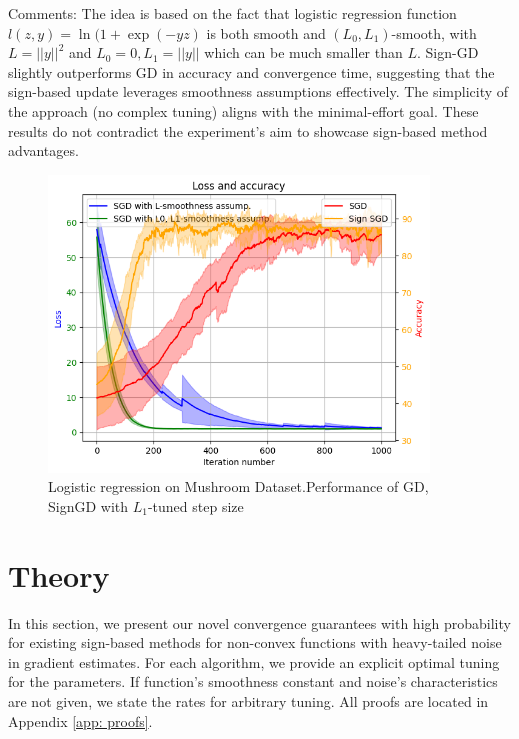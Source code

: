 \documentclass[12pt]{article}
\begin{document}
Comments: 
The idea is based on the fact that logistic regression function $l(z,y) = \ln (1 + \exp(-yz)$  is both smooth and $(L_0, L_1)$-smooth, with $L = || y ||^2$ and $L_0 = 0, L_1 = || y ||$ which can be much smaller than $L$. Sign-GD slightly outperforms GD in accuracy and convergence time, suggesting that the sign-based update leverages smoothness assumptions effectively. The simplicity of the approach (no complex tuning) aligns with the minimal-effort goal. These results do not contradict the experiment’s aim to showcase sign-based method advantages.
\begin{figure}[!h]
    \centering
    \includegraphics[width=0.9\textwidth]{basic_experiment2.png}
    \caption{Logistic regression on Mushroom Dataset.\newline Performance of GD, SignGD with $L_1 $-tuned step size}
    \label{fig:logreg}
\end{figure}


\newpage


\section{Theory}

In this section, we present our novel convergence guarantees with high probability for existing sign-based methods for non-convex functions with heavy-tailed noise in gradient estimates. For each algorithm, we provide an explicit optimal tuning for the parameters. If function's smoothness constant and noise's characteristics are not given, we state the rates for arbitrary tuning. All proofs are located in Appendix \ref{app: proofs}.
\end{document}
